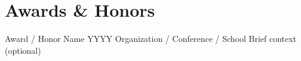 
\section{Awards \& Honors}

\resumeSubHeadingListStart
    \resumeSubheading
        {Award / Honor Name}
        {YYYY}
        {Organization / Conference / School}
        {Brief context (optional)}
\resumeSubHeadingListEnd
